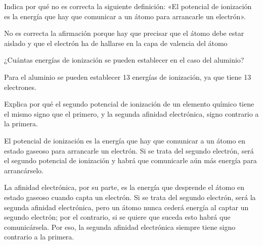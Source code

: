 \begin{question}
    Indica por qué no es correcta la siguiente definición:
    «El potencial de ionización es la energía que hay que
    comunicar a un átomo para arrancarle un electrón».


    \begin{solu}
        No es correcta la afirmación porque hay que precisar que el
        átomo debe estar aislado y que el electrón ha de hallarse en
        la capa de valencia del átomo
    \end{solu}

\end{question}

\begin{question}
    ¿Cuántas energías de ionización se pueden establecer
    en el caso del aluminio?

    \begin{solu}
        Para el aluminio se pueden establecer 13 energías de ionización,
        ya que tiene 13 electrones.
    \end{solu}

\end{question}

\begin{question}
    Explica por qué el segundo potencial de ionización de
    un elemento químico tiene el mismo signo que el primero,
    y la segunda afinidad electrónica, signo contrario
    a la primera.


    \begin{solu}
        El potencial de ionización es la energía que hay que comunicar
        a un átomo en estado gaseoso para arrancarle un electrón.
        Si se trata del segundo electrón, será el segundo potencial
        de ionización y habrá que comunicarle aún más energía
        para arrancárselo.

        La afinidad electrónica, por su parte, es la energía que desprende
        el átomo en estado gaseoso cuando capta un electrón. Si se trata del segundo electrón, será la segunda afinidad electrónica, pero un átomo nunca cederá energía al captar un
        segundo electrón; por el contrario, si se quiere que suceda
        esto habrá que comunicársela. Por eso, la segunda afinidad
        electrónica siempre tiene signo contrario a la primera.

    \end{solu}

\end{question}

